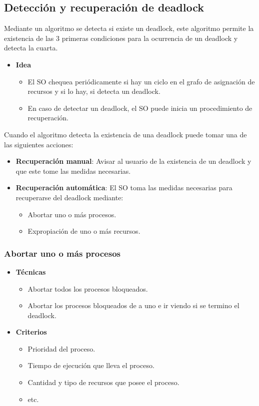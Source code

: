 \documentclass{templateNote}
\begin{document}
\subsection*{Detección y recuperación de deadlock}
Mediante un algoritmo se detecta si existe un deadlock, este algoritmo permite la existencia de las 3 primeras condiciones para la ocurrencia de un deadlock y detecta la cuarta.

\newpage
\begin{itemize}
    \item \textbf{Idea}
    \begin{itemize}
        \item El SO chequea periódicamente si hay un ciclo en el grafo de asignación de recursos y si lo hay, si detecta un deadlock.
        \item En caso de detectar un deadlock, el SO puede inicia un procedimiento de recuperación.
    \end{itemize}
\end{itemize}
Cuando el algoritmo detecta la existencia de una deadlock puede tomar una de las siguientes acciones:
\begin{itemize}
    \item \textbf{Recuperación manual}: Avisar al usuario de la existencia de un deadlock y que este tome las medidas necesarias.
    \item \textbf{Recuperación automática}: El SO toma las medidas necesarias para recuperarse del deadlock mediante:
    \begin{itemize}
        \item Abortar uno o más procesos.
        \item Expropiación de uno o más recursos.
    \end{itemize}
\end{itemize}


\subsubsection*{Abortar uno o más procesos}
\begin{itemize}
    \item \textbf{Técnicas}
    \begin{itemize}
        \item Abortar todos los procesos bloqueados.
        \item Abortar los procesos bloqueados de a uno e ir viendo si se termino el deadlock.
    \end{itemize}
    \item \textbf{Criterios}
    \begin{itemize}
        \item Prioridad del proceso.
        \item Tiempo de ejecución que lleva el proceso.
        \item Cantidad y tipo de recursos que posee el proceso.
        \item etc.
    \end{itemize} 
\end{itemize}
\end{document}
